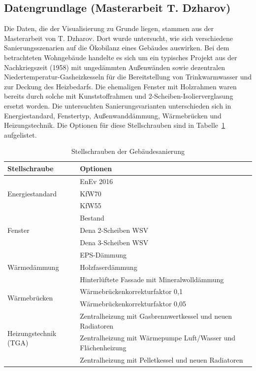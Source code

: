\subsection{Datengrundlage (Masterarbeit T. Dzharov)}
Die Daten, die der Visualisierung zu Grunde liegen, stammen aus der Masterarbeit von T. Dzharov. Dort wurde untersucht, wie sich verschiedene Sanierungsszenarien auf die Ökobilanz eines Gebäudes auswirken. Bei dem betrachteten Wohngebäude handelte es sich um ein typisches Projekt aus der Nachkriegszeit (1958) mit ungedämmten Außenwänden sowie dezentralen Niedertemperatur-Gasheizkesseln für die Bereitstellung von Trinkwarmwasser und zur Deckung des Heizbedarfs. Die ehemaligen Fenster mit Holzrahmen waren bereits durch solche mit Kunststoffrahmen und 2-Scheiben-Isolierverglasung ersetzt worden. Die untersuchten Sanierungsvarianten unterschieden sich in Energiestandard, Fenstertyp, Außenwanddämmung, Wärmebrücken und Heizungstechnik. Die Optionen für diese Stellschrauben sind in Tabelle~\ref{tab:layers} aufgelistet. 
 
\begin{table}[htpb]
	\caption[Example table]{Stellschrauben der Gebäudesanierung}\label{tab:layers}
	\centering
	\begin{tabular}{l p{10cm}}
		\toprule
		Stellschraube & Optionen \\
		\midrule
		\multirow{3}{*}{Energiestandard} & EnEv 2016\\
		& KfW70 \\
		& KfW55\\ \hline
	    \multirow{3}{*}{Fenster} & Bestand\\
		& Dena 2-Scheiben WSV \\
		& Dena 3-Scheiben WSV\\ \hline
	    \multirow{3}{*}{Wärmedämmung} & EPS-Dämmung\\
		& Holzfaserdämmung \\
		& Hinterlüftete Fassade mit Mineralwolldämmung\\ \hline
	    \multirow{2}{*}{Wärmebrücken} & Wärmebrückenkorrekturfaktor 0,1\\
		& Wärmebrückenkorrekturfaktor 0,05 \\ \hline
	    \multirow{3}{*}{Heizungstechnik (TGA)} & Zentralheizung mit Gasbrennwertkessel und neuen Radiatoren\\
		& Zentralheizung mit Wärmepumpe Luft/Wasser und Flächenheizung \\
		& Zentralheizung mit Pelletkessel und neuen Radiatoren\\ \hline
		\bottomrule
	\end{tabular}
\end{table}

